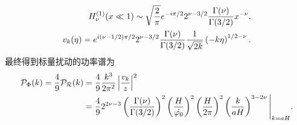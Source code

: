 \begin{align}
  H^{(1)}_{\nu}(x\ll 1) \sim \sqrt{\frac{2}{\pi}}e^{-i\pi /2}2^{\nu-3 /2}
  \frac{\Gamma(\nu)}{\Gamma(3 /2)}x^{-\nu}, \\
  v_{k}(\eta)=e^{i(\nu-1 /2)\pi /2}2^{\nu-3 /2}
  \frac{\Gamma(\nu)}{\Gamma(3 /2)} \frac{1}{\sqrt{2k}}\left(-k\eta\right)^{1
  /2-\nu}.
\end{align}
最终得到标量扰动的功率谱为
\begin{align}
  \mathcal{P}_{\Phi}(k)=\frac{4}{9}\mathcal{P}_{\mathcal{R}}(k) 
  &= \frac{4}{9}\frac{k^3}{2\pi^2}\left\lvert\frac{v_{k}}{z}\right\rvert^2 \notag\\
               &= \frac{4}{9}2^{2\nu -3}\left(\frac{\Gamma(\nu)}{\Gamma(3 /2)}\right)^2
               \left(\frac{H}{\dot{\varphi_0}}\right)^2
               \left(\frac{H}{2\pi}\right)^2
               \left(\frac{k}{aH}\right)^{3-2\nu}
             \Bigg\rvert_{k=aH}.
\end{align}


% 
